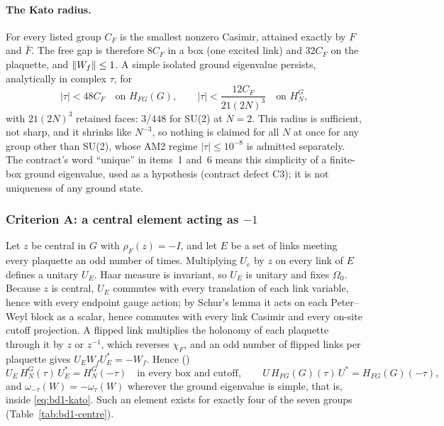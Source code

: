\paragraph{The Kato radius.} For every listed group $C_F$ is the smallest
nonzero Casimir, attained exactly by $F$ and $\bar F$. The free gap is
therefore $8C_F$ in a box (one excited link) and $32C_F$ on the plaquette,
and $\left\lVert W_f\right\rVert\le1$. A simple isolated ground eigenvalue persists,
analytically in complex $\tau$, for
\begin{equation}
 |\tau|<48C_F\quad\text{on }H_{FG}(G),\qquad
 |\tau|<\frac{12C_F}{21(2N)^3}\quad\text{on }H^G_N,
 \label{eq:bd1-kato}
\end{equation}
with $21(2N)^3$ retained faces: $3/448$ for SU(2) at $N=2$. This radius is
sufficient, not sharp, and it shrinks like $N^{-3}$, so nothing is claimed
for all $N$ at once for any group other than SU(2), whose AM2 regime
$|\tau|\le10^{-8}$ is admitted separately. The contract's word ``unique'' in
items~1 and~6 means this simplicity of a finite-box ground eigenvalue, used as
a hypothesis (contract defect C3); it is not uniqueness of any ground state.

\subsubsection{\texorpdfstring{Criterion A: a central element acting as $-1$}{Criterion A: a central element acting as -1}}
\label{sec:bd1-flip}
Let $z$ be central in $G$ with $\rho_F(z)=-I$, and let $E$ be a set of links
meeting every plaquette an odd number of times. Multiplying $U_e$ by $z$ on
every link of $E$ defines a unitary $U_E$. Haar measure is invariant, so
$U_E$ is unitary and fixes $\Omega_0$. Because $z$ is central, $U_E$ commutes
with every translation of each link variable, hence with every endpoint gauge
action; by Schur's lemma it acts on each Peter--Weyl block as a scalar, hence
commutes with every link Casimir and every on-site cutoff projection. A
flipped link multiplies the holonomy of each plaquette through it by $z$ or
$z^{-1}$, which reverses $\chi_F$, and an odd number of flipped links per
plaquette gives $U_EW_fU_E^*=-W_f$. Hence ()
\begin{equation}
 U_E\,H^G_N(\tau)\,U_E^*=H^G_N(-\tau)\quad\text{in every box and cutoff},\qquad
 U\,H_{FG}(G)(\tau)\,U^*=H_{FG}(G)(-\tau),
 \label{eq:bd1-flip}
\end{equation}
and $\omega_{-\tau}(W)=-\omega_\tau(W)$ wherever the ground eigenvalue is
simple, that is, inside \eqref{eq:bd1-kato}. Such an element exists for
exactly four of the seven groups (Table~\ref{tab:bd1-centre}).

